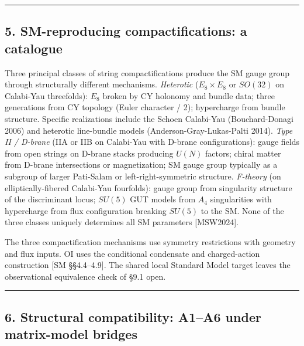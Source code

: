 \documentclass[
]{article}
\begin{document}
\begin{center}\rule{0.5\linewidth}{0.5pt}\end{center}

\hypertarget{sm-reproducing-compactifications-a-catalogue}{%
\subsection{5. SM-reproducing compactifications: a
catalogue}\label{sm-reproducing-compactifications-a-catalogue}}

Three principal classes of string compactifications produce the SM gauge
group through structurally different mechanisms. \emph{Heterotic}
(\(E_8 \times E_8\) or \(SO(32)\) on Calabi-Yau threefolds): \(E_8\)
broken by CY holonomy and bundle data; three generations from CY
topology (Euler character / 2); hypercharge from bundle structure.
Specific realizations include the Schoen Calabi-Yau (Bouchard-Donagi
2006) and heterotic line-bundle models (Anderson-Gray-Lukas-Palti 2014).
\emph{Type II / D-brane} (IIA or IIB on Calabi-Yau with D-brane
configurations): gauge fields from open strings on D-brane stacks
producing \(U(N)\) factors; chiral matter from D-brane intersections or
magnetization; SM gauge group typically as a subgroup of larger
Pati-Salam or left-right-symmetric structure. \emph{F-theory} (on
elliptically-fibered Calabi-Yau fourfolds): gauge group from singularity
structure of the discriminant locus; \(SU(5)\) GUT models from \(A_4\)
singularities with hypercharge from flux configuration breaking
\(SU(5)\) to the SM. None of the three classes uniquely determines all
SM parameters {[}MSW2024{]}.

The three compactification mechanisms use symmetry restrictions with
geometry and flux inputs. OI uses the conditional condensate and
charged-action construction {[}SM §§4.4--4.9{]}. The shared local
Standard Model target leaves the observational equivalence check of §9.1
open.

\begin{center}\rule{0.5\linewidth}{0.5pt}\end{center}

\hypertarget{structural-compatibility-a1a6-under-matrix-model-bridges}{%
\subsection{6. Structural compatibility: A1--A6 under matrix-model
bridges}\label{structural-compatibility-a1a6-under-matrix-model-bridges}}
\end{document}
